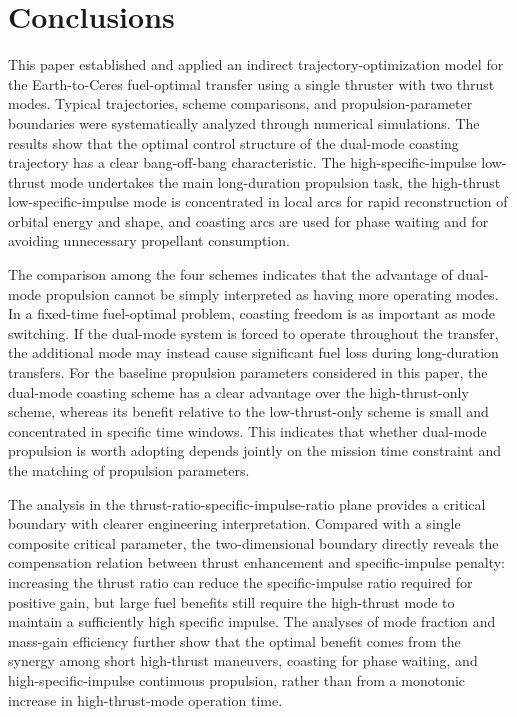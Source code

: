 ﻿\documentclass{IEEEtaes}
\begin{document}
\section{Conclusions}
This paper established and applied an indirect trajectory-optimization model for the Earth-to-Ceres fuel-optimal transfer using a single thruster with two thrust modes. Typical trajectories, scheme comparisons, and propulsion-parameter boundaries were systematically analyzed through numerical simulations. The results show that the optimal control structure of the dual-mode coasting trajectory has a clear bang-off-bang characteristic. The high-specific-impulse low-thrust mode undertakes the main long-duration propulsion task, the high-thrust low-specific-impulse mode is concentrated in local arcs for rapid reconstruction of orbital energy and shape, and coasting arcs are used for phase waiting and for avoiding unnecessary propellant consumption.

The comparison among the four schemes indicates that the advantage of dual-mode propulsion cannot be simply interpreted as having more operating modes. In a fixed-time fuel-optimal problem, coasting freedom is as important as mode switching. If the dual-mode system is forced to operate throughout the transfer, the additional mode may instead cause significant fuel loss during long-duration transfers. For the baseline propulsion parameters considered in this paper, the dual-mode coasting scheme has a clear advantage over the high-thrust-only scheme, whereas its benefit relative to the low-thrust-only scheme is small and concentrated in specific time windows. This indicates that whether dual-mode propulsion is worth adopting depends jointly on the mission time constraint and the matching of propulsion parameters.

The analysis in the thrust-ratio-specific-impulse-ratio plane provides a critical boundary with clearer engineering interpretation. Compared with a single composite critical parameter, the two-dimensional boundary directly reveals the compensation relation between thrust enhancement and specific-impulse penalty: increasing the thrust ratio can reduce the specific-impulse ratio required for positive gain, but large fuel benefits still require the high-thrust mode to maintain a sufficiently high specific impulse. The analyses of mode fraction and mass-gain efficiency further show that the optimal benefit comes from the synergy among short high-thrust maneuvers, coasting for phase waiting, and high-specific-impulse continuous propulsion, rather than from a monotonic increase in high-thrust-mode operation time.
\end{document}
